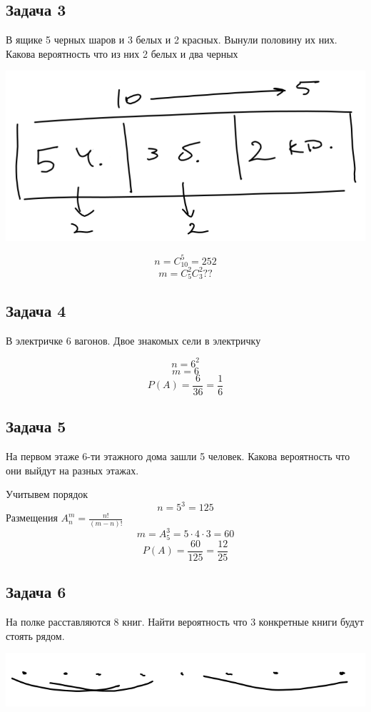 \documentclass[english]{article}
\theoremstyle{plain}
\theoremstyle{remark}
\theoremstyle{definition}
\begin{document}
\subsection{Задача 3}
\label{sec:orgda34c75}
В ящике 5 черных шаров и 3 белых и 2 красных. Вынули половину их них. Какова вероятность что из них 2 белых и два черных

\begin{center}
\includegraphics[width=.9\linewidth]{1_3.png}
\end{center}

\[ n = C^5_{10} = 252 \]
\[ m = C^2_5C^2_3 ?? \]


\subsection{Задача 4}
\label{sec:orgfc433ec}
В электричке 6 вагонов. Двое знакомых сели в электричку

\[ n = 6^2 \]
\[ m = 6 \]
\[ P(A) = \frac{6}{36} = \frac{1}{6} \]

\subsection{Задача 5}
\label{sec:org24f823b}
На первом этаже 6-ти этажного дома зашли 5 человек. Какова вероятность что они выйдут на разных этажах.

Учитывем порядок
\[ n = 5^3 = 125 \]
Размещения \(A^m_n = \frac{n!}{(m - n)!}\)
\[ m =  A^3_5 = 5\cdot 4\cdot 3 = 60 \]
\[ P(A) = \frac{60}{125} = \frac{12}{25} \]

\subsection{Задача 6}
\label{sec:org6d5b105}
На полке расставляются 8 книг. Найти вероятность что 3 конкретные книги будут стоять рядом.

\begin{center}
\includegraphics[width=.9\linewidth]{1_6.png}
\end{center}
\end{document}
